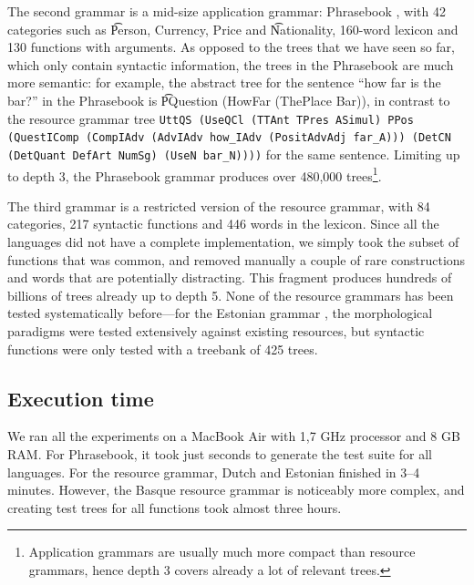 The second grammar is a mid-size application grammar: Phrasebook
\cite{ranta2010phrasebook}, with 42 categories such as \t{Person,
  Currency, Price} and \t{Nationality}, 160-word lexicon and 130
functions with arguments. As opposed to the trees that we have seen so far,
which only contain syntactic information, the trees in the Phrasebook
are much more semantic: for example, the abstract tree for the
sentence ``how far is the bar?'' in the Phrasebook is \t{PQuestion
  (HowFar (ThePlace Bar))}, in contrast to the resource grammar tree
{\tt \small UttQS (UseQCl (TTAnt TPres ASimul) PPos (QuestIComp
  (CompIAdv (AdvIAdv how\_IAdv (PositAdvAdj far\_A))) 
  (DetCN (DetQuant DefArt NumSg) (UseN bar\_N))))} for the same
sentence. Limiting up to depth 3, the Phrasebook grammar produces over
480,000 trees\footnote{Application grammars are usually
much more compact than resource grammars, hence depth 3 covers already
a lot of relevant trees.}.



The third grammar is a restricted version of the \gf{} resource grammar,
with 84 categories, 217 syntactic functions and 446 words in the
lexicon. Since all the languages did not have a complete
implementation, we simply took the subset of functions that was
common, and removed manually a couple of rare constructions and words
that are potentially distracting. 
This fragment produces hundreds of billions of trees already up to depth 5.
None of the resource grammars has been tested systematically before---for
the Estonian grammar \cite{listenmaa_kaljurand2014}, the morphological
paradigms were tested extensively against existing resources, but
syntactic functions were only tested with a treebank of 425 trees.


\subsection{Execution time} We ran all the experiments on a MacBook Air
with 1,7 GHz processor and 8 GB RAM. For Phrasebook, it took just
seconds to generate the test suite for all languages. For the resource
grammar, Dutch and Estonian finished in 3--4 minutes. However, the
Basque resource grammar is noticeably more complex, and creating test
trees for all functions took almost three hours.

